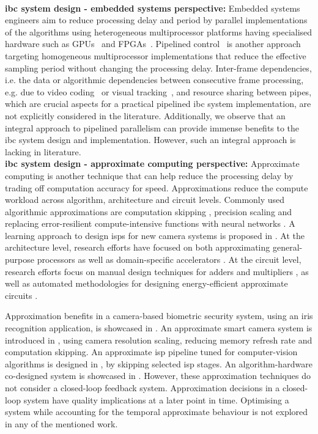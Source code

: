 \\[1ex]
\noindent\textbf{\gls{ibc} system design - embedded systems perspective:}
Embedded systems engineers aim to reduce processing delay and period by parallel implementations of the algorithms using heterogeneous multiprocessor platforms having specialised hardware such as GPUs~\cite{agrawal2014gpu} and FPGAs~\cite{kestur2012emulating}. 
Pipelined control~\cite{krautgartner1998performance,medina2019designing} is another approach targeting homogeneous multiprocessor implementations that reduce the effective sampling period without changing the processing delay.
Inter-frame dependencies, i.e. the data or algorithmic dependencies between consecutive frame processing, e.g. due to video coding~\cite{li2015lagrangian} or visual tracking~\cite{smeulders2013visual}, and resource sharing between pipes, which are crucial aspects for a practical pipelined \gls{ibc} system implementation, are not explicitly considered in the literature.
Additionally, we observe that an integral approach to pipelined parallelism can provide immense benefits to the \gls{ibc} system design and implementation. However, such an integral approach is lacking in literature. 
\\[1ex]
\noindent\textbf{\gls{ibc} system design - approximate computing perspective:}
Approximate computing is another technique that can help reduce the processing delay by trading off computation accuracy for speed. 
Approximations reduce the compute workload across algorithm, architecture and circuit levels. Commonly used algorithmic approximations are computation skipping \cite{comp_skip}, precision scaling \cite{precision_scaling} and replacing error-resilient compute-intensive functions with neural networks \cite{nn_invoke}. A learning approach to design \glspl{isp} for new camera systems is proposed in \cite{learning_isp}. At the architecture level, research efforts have focused on both approximating general-purpose processors\cite{ProACt} as well as domain-specific accelerators \cite{sde}. At the circuit level, research efforts focus on manual design techniques for adders and multipliers \cite{approx_maual}, as well as automated methodologies for designing energy-efficient approximate circuits \cite{sde2}.

Approximation benefits in a camera-based biometric security system, using an iris recognition application, is showcased in \cite{8342029}. An approximate smart camera system is introduced in \cite{araha}, using camera resolution scaling, reducing memory refresh rate and computation skipping. An approximate \gls{isp} pipeline tuned for computer-vision algorithms is designed in \cite{buckler}, by skipping selected \gls{isp} stages. An algorithm-hardware co-designed system is showcased in \cite{euphrates}. 
However, these approximation techniques do not consider a closed-loop feedback system. Approximation decisions in a closed-loop system have quality implications at a later point in time. Optimising a system while accounting for the temporal approximate behaviour is not explored in any of the mentioned work.